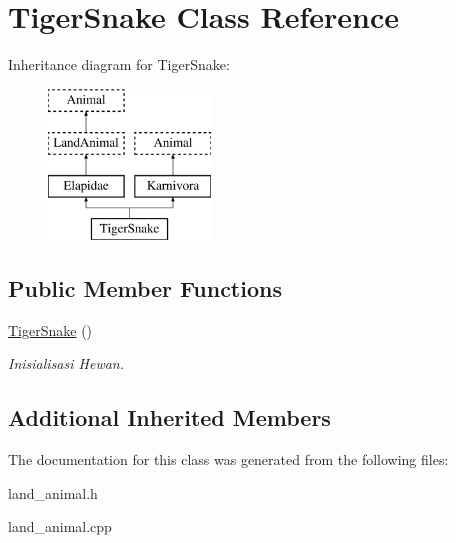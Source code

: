 \hypertarget{class_tiger_snake}{}\section{Tiger\+Snake Class Reference}
\label{class_tiger_snake}
Inheritance diagram for Tiger\+Snake\+:\begin{figure}[H]
\begin{center}
\leavevmode
\includegraphics[height=4.000000cm]{class_tiger_snake}
\end{center}
\end{figure}
\subsection*{Public Member Functions}
\begin{DoxyCompactItemize}
\item 
\hyperlink{class_tiger_snake_a485817e72dca2c0f24d46814478e66df}{Tiger\+Snake} ()\hypertarget{class_tiger_snake_a485817e72dca2c0f24d46814478e66df}{}\label{class_tiger_snake_a485817e72dca2c0f24d46814478e66df}

\begin{DoxyCompactList}\small\item\em Inisialisasi Hewan. \end{DoxyCompactList}\end{DoxyCompactItemize}
\subsection*{Additional Inherited Members}


The documentation for this class was generated from the following files\+:\begin{DoxyCompactItemize}
\item 
land\+\_\+animal.\+h\item 
land\+\_\+animal.\+cpp\end{DoxyCompactItemize}
